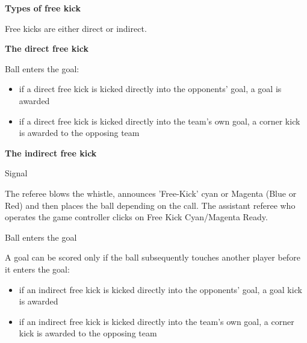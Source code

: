\clearpage
\sffamily
{\bfseries\color[rgb]{0.4,0.4,0.4}{Law 13 -- Free Kicks} }
{\color{magenta}
{}

\bigskip

{\bfseries Types of free kick}

\headlinebox

Free kicks are either direct or indirect.

\bigskip

{\bfseries The direct free kick }

\headlinebox

Ball enters the goal:

\begin{itemize}
\item if a direct free kick is kicked directly into the
opponents{\textquoteright} goal, a goal is awarded
\item if a direct free kick is kicked directly into the team's own goal, a corner kick is awarded to the opposing team
\end{itemize}

\bigskip

{\bfseries The indirect free kick}

\headlinebox

Signal

The referee blows the whistle, announces 'Free-Kick' cyan or Magenta (Blue or Red) and then  places the ball depending on the call. The assistant referee who operates the game controller clicks on Free Kick Cyan/Magenta Ready. 



\bigskip

Ball enters the goal

A goal can be scored only if the ball subsequently touches another player before it enters the goal:

\begin{itemize}
\item if an indirect free kick is kicked directly into the
opponents' goal, a goal kick is awarded
\item if an indirect free kick is kicked directly into the
team's own goal, a corner kick is awarded to the
opposing team
\end{itemize}

}
